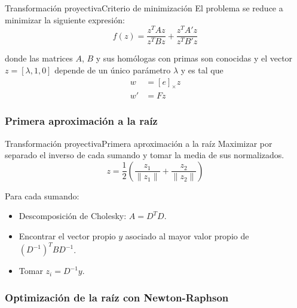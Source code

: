 \documentclass[14pt,spanish]{beamer}
\begin{document}
      \begin{frame}{Transformación proyectiva}{Criterio de minimización}
          El problema se reduce a minimizar la siguiente expresión:
          \begin{equation}
              f(z) = \frac{z^T Az}{z^T Bz} + \frac{z^T A'z}{z^T B'z}
              \label{eq_minz}
          \end{equation}

          donde las matrices $A$, $B$ y sus homólogas con primas son conocidas y el vector $z = [\lambda, 1, 0]$ depende de un único parámetro $\lambda$ y es tal que
          \begin{align*}
            w &= [e]_\times z\\
            w' &= Fz
          \end{align*}
      \end{frame}

      \subsubsection{Primera aproximación a la raíz}

        \begin{frame}{Transformación proyectiva}{Primera aproximación a la raíz}
            Maximizar por separado el inverso de cada sumando y tomar la media de sus normalizados.
            \[
            z = \frac{1}{2}\left(\frac{z_1}{\lVert z_1 \rVert} + \frac{z_2}{\lVert z_2 \rVert}\right)
            \]

            Para cada sumando:
            \begin{itemize}
                \item<2-> Descomposición de Cholesky: $A = D^T D$.
                \item<3-> Encontrar el vector propio $y$ asociado al mayor valor propio de $(D^{-1})^T B D^{-1}$.
                \item<4-> Tomar $z_i = D^{-1}y$.
            \end{itemize}
        \end{frame}
      \subsubsection{Optimización de la raíz con Newton-Raphson}
\end{document}
